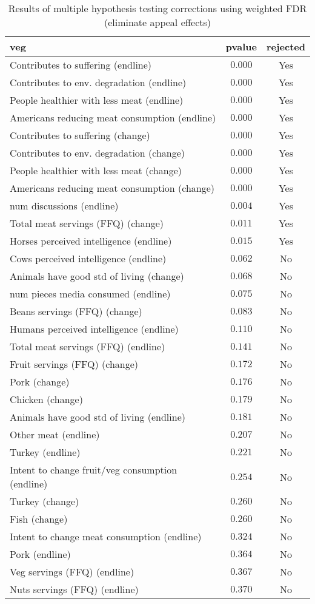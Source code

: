 \begin{table*}[ht]
\caption{Results of multiple hypothesis testing corrections using weighted FDR (eliminate appeal effects)\label{veg}} 
\begin{center}
\begin{tabular}{lcc}
\hline\hline
\multicolumn{1}{l}{veg}&\multicolumn{1}{c}{pvalue}&\multicolumn{1}{c}{rejected}\tabularnewline
\hline
Contributes to suffering (endline)&$0.000$&Yes\tabularnewline
Contributes to env. degradation (endline)&$0.000$&Yes\tabularnewline
People healthier with less meat (endline)&$0.000$&Yes\tabularnewline
Americans reducing meat consumption (endline)&$0.000$&Yes\tabularnewline
Contributes to suffering (change)&$0.000$&Yes\tabularnewline
Contributes to env. degradation (change)&$0.000$&Yes\tabularnewline
People healthier with less meat (change)&$0.000$&Yes\tabularnewline
Americans reducing meat consumption (change)&$0.000$&Yes\tabularnewline
num discussions (endline)&$0.004$&Yes\tabularnewline
Total meat servings (FFQ) (change)&$0.011$&Yes\tabularnewline
Horses perceived intelligence (endline)&$0.015$&Yes\tabularnewline
Cows perceived intelligence (endline)&$0.062$&No\tabularnewline
Animals have good std of living (change)&$0.068$&No\tabularnewline
num pieces media consumed (endline)&$0.075$&No\tabularnewline
Beans servings (FFQ) (change)&$0.083$&No\tabularnewline
Humans perceived intelligence (endline)&$0.110$&No\tabularnewline
Total meat servings (FFQ) (endline)&$0.141$&No\tabularnewline
Fruit servings (FFQ) (change)&$0.172$&No\tabularnewline
Pork (change)&$0.176$&No\tabularnewline
Chicken (change)&$0.179$&No\tabularnewline
Animals have good std of living (endline)&$0.181$&No\tabularnewline
Other meat (endline)&$0.207$&No\tabularnewline
Turkey (endline)&$0.221$&No\tabularnewline
Intent to change fruit/veg consumption (endline)&$0.254$&No\tabularnewline
Turkey (change)&$0.260$&No\tabularnewline
Fish (change)&$0.260$&No\tabularnewline
Intent to change meat consumption (endline)&$0.324$&No\tabularnewline
Pork (endline)&$0.364$&No\tabularnewline
Veg servings (FFQ) (endline)&$0.367$&No\tabularnewline
Nuts servings (FFQ) (endline)&$0.370$&No\tabularnewline
\hline
\end{tabular}\end{center}

\end{table*}
